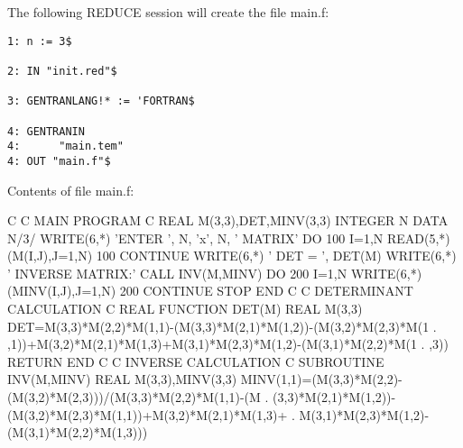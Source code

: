 The following REDUCE session will create the file main.f:
\begin{verbatim}
1: n := 3$ 

2: IN "init.red"$ 

3: GENTRANLANG!* := 'FORTRAN$ 

4: GENTRANIN 
4:      "main.tem" 
4: OUT "main.f"$ 
\end{verbatim}
Contents of file main.f:
\begin{framedverbatim}
C                                                         
C  MAIN PROGRAM                                           
C                                                         
      REAL M(3,3),DET,MINV(3,3)                         
      INTEGER N                                           
      DATA N/3/                                           
      WRITE(6,*) 'ENTER ', N, 'x', N, ' MATRIX'           
      DO 100 I=1,N                                        
          READ(5,*) (M(I,J),J=1,N)                        
100   CONTINUE                                            
      WRITE(6,*) ' DET = ', DET(M)                        
      WRITE(6,*) ' INVERSE MATRIX:'                       
      CALL INV(M,MINV)                                    
      DO 200 I=1,N                                        
          WRITE(6,*) (MINV(I,J),J=1,N)                    
200   CONTINUE                                            
      STOP                                                
      END                                                 
C                                                         
C  DETERMINANT CALCULATION                                
C                                                         
      REAL FUNCTION DET(M)                              
      REAL M(3,3)                                       
      DET=M(3,3)*M(2,2)*M(1,1)-(M(3,3)*M(2,1)*M(1,2))-(M(3,2)*M(2,3)*M(1
     . ,1))+M(3,2)*M(2,1)*M(1,3)+M(3,1)*M(2,3)*M(1,2)-(M(3,1)*M(2,2)*M(1
     . ,3))
      RETURN                                              
      END                                                 
C                                                         
C  INVERSE CALCULATION                                    
C                                                         
      SUBROUTINE INV(M,MINV)                              
      REAL M(3,3),MINV(3,3)                             
      MINV(1,1)=(M(3,3)*M(2,2)-(M(3,2)*M(2,3)))/(M(3,3)*M(2,2)*M(1,1)-(M
     . (3,3)*M(2,1)*M(1,2))-(M(3,2)*M(2,3)*M(1,1))+M(3,2)*M(2,1)*M(1,3)+
     . M(3,1)*M(2,3)*M(1,2)-(M(3,1)*M(2,2)*M(1,3)))

\end{framedverbatim}
